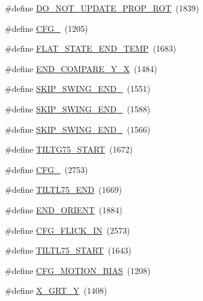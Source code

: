 \begin{DoxyCompactItemize}
\item 
\#define \hyperlink{group___d_r_i_v_e_r_s_gae7f639b1d39b818bc03ba14cf334bf68}{D\+O\+\_\+\+N\+O\+T\+\_\+\+U\+P\+D\+A\+T\+E\+\_\+\+P\+R\+O\+P\+\_\+\+R\+OT}~(1839)
\item 
\#define \hyperlink{group___d_r_i_v_e_r_s_gaf07742dc92c885f8f7d59e70683f9257}{C\+F\+G\+\_}~(1205)
\item 
\#define \hyperlink{group___d_r_i_v_e_r_s_gaba18283a93fa46f0251d4a6131ed2d5d}{F\+L\+A\+T\+\_\+\+S\+T\+A\+T\+E\+\_\+\+E\+N\+D\+\_\+\+T\+E\+MP}~(1683)
\item 
\#define \hyperlink{group___d_r_i_v_e_r_s_gab843d731bb3863d28961b6a92f302053}{E\+N\+D\+\_\+\+C\+O\+M\+P\+A\+R\+E\+\_\+\+Y\+\_\+X}~(1484)
\item 
\#define \hyperlink{group___d_r_i_v_e_r_s_gae14f280fb2449ecb6dcb8782a8dfd088}{S\+K\+I\+P\+\_\+\+S\+W\+I\+N\+G\+\_\+\+E\+N\+D\+\_}~(1551)
\item 
\#define \hyperlink{group___d_r_i_v_e_r_s_ga17ac0b4bafc904502e30e9c718a83d15}{S\+K\+I\+P\+\_\+\+S\+W\+I\+N\+G\+\_\+\+E\+N\+D\+\_}~(1588)
\item 
\#define \hyperlink{group___d_r_i_v_e_r_s_gad179280ab7654fcada6f0816f6b0eda8}{S\+K\+I\+P\+\_\+\+S\+W\+I\+N\+G\+\_\+\+E\+N\+D\+\_}~(1566)
\item 
\#define \hyperlink{group___d_r_i_v_e_r_s_ga158f88485952a3849f3833c145854d99}{T\+I\+L\+T\+G75\+\_\+\+S\+T\+A\+RT}~(1672)
\item 
\#define \hyperlink{group___d_r_i_v_e_r_s_ga40938f669c5b33b4316a7a5fba679eba}{C\+F\+G\+\_}~(2753)
\item 
\#define \hyperlink{group___d_r_i_v_e_r_s_gac23b1dfe6637cd51283c18aa3d2e9c50}{T\+I\+L\+T\+L75\+\_\+\+E\+ND}~(1669)
\item 
\#define \hyperlink{group___d_r_i_v_e_r_s_gabe465e03425237cc6043670f55f28d02}{E\+N\+D\+\_\+\+O\+R\+I\+E\+NT}~(1884)
\item 
\#define \hyperlink{group___d_r_i_v_e_r_s_gad4e759975ee4ab865e8bd1ebd7f48908}{C\+F\+G\+\_\+\+F\+L\+I\+C\+K\+\_\+\+IN}~(2573)
\item 
\#define \hyperlink{group___d_r_i_v_e_r_s_ga0ca3aa6c4c503f68cab0bbba28325f12}{T\+I\+L\+T\+L75\+\_\+\+S\+T\+A\+RT}~(1643)
\item 
\#define \hyperlink{group___d_r_i_v_e_r_s_ga8214527cbba23694722d04715126be0f}{C\+F\+G\+\_\+\+M\+O\+T\+I\+O\+N\+\_\+\+B\+I\+AS}~(1208)
\item 
\#define \hyperlink{group___d_r_i_v_e_r_s_ga70e52e79b5774e056a86795a52e3b027}{X\+\_\+\+G\+R\+T\+\_\+Y}~(1408)

\end{DoxyCompactItemize}
